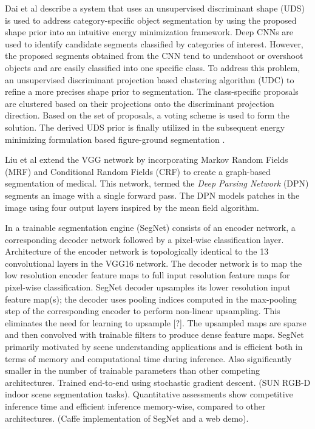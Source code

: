 \documentclass[letterpaper, 10 pt, conference]{ieeeconf}  %
\begin{document}
Dai et al describe a system that uses an unsupervised discriminant shape (UDS) is used to address category-specific object segmentation by using the proposed shape prior into an intuitive energy minimization framework. Deep CNNs are used to identify candidate segments classified by categories of interest. However, the proposed segments obtained from the CNN tend to undershoot or overshoot objects and are easily classified into one specific class. To address this problem, an unsupervised discriminant projection based clustering algorithm (UDC) to refine a more precises shape prior to segmentation. The class-specific proposals are clustered based on their projections onto the discriminant projection direction. Based on the set of proposals, a voting scheme is used to form the solution. The derived UDS prior is finally utilized in the subsequent energy minimizing formulation based figure-ground segmentation \cite{dai_r-fcn:_2016}. 

Liu et al \cite{liu_semantic_2015} extend the VGG network by incorporating Markov Random Fields (MRF) and Conditional Random Fields (CRF) to create a graph-based segmentation of medical. This network, termed the \textit{Deep Parsing Network} (DPN) segments an image with a single forward pass.  The DPN models patches in the image using four output layers inspired by the mean field algorithm.  

In \cite{badrinarayanan_segnet:_2015}  a trainable segmentation engine (SegNet) consists of an encoder network, a corresponding decoder network followed by a pixel-wise classification layer. Architecture of the encoder network is topologically identical to the 13 convolutional layers in the VGG16 network. The decoder network is to map the low resolution encoder feature maps to full input resolution feature maps for pixel-wise classification. SegNet decoder upsamples its lower resolution input feature map(s); the decoder uses pooling indices computed in the max-pooling step of the corresponding encoder to perform non-linear upsampling. This eliminates the need for learning to upsample [?]. The upsampled maps are sparse and then convolved with trainable filters to produce dense feature maps. SegNet primarily motivated by scene understanding applications and is efficient both in terms of memory and computational time during inference. Also significantly smaller in the number of trainable parameters than other competing architectures. Trained end-to-end using stochastic gradient descent. (SUN RGB-D indoor scene segmentation tasks). Quantitative assessments show competitive inference time and efficient inference memory-wise, compared to other architectures. (Caffe implementation of SegNet and a web demo).
\end{document}
